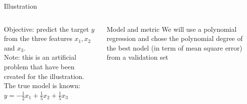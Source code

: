\documentclass[handout, 10pt]{beamer}
\begin{document}
\begin{frame}{Illustration}
\begin{columns}
    
\alert{Objective:} predict the target $y$ from the three features $x_1, x_2$ and $x_3$.\\
\vspace{2em}
Note: this is an artificial problem that have been created for the illustration. The true model is known:\\
$ y = -\frac{1}{2} x_1 + \frac{1}{5} x_2 +\frac{1}{5} x_3$

\pause
\begin{block}{Model and metric}
We will use a polynomial regression and chose the polynomial degree of the best nodel (in term of mean square error) from a validation set
\end{block}

\end{columns}

\end{frame}
\end{document}
